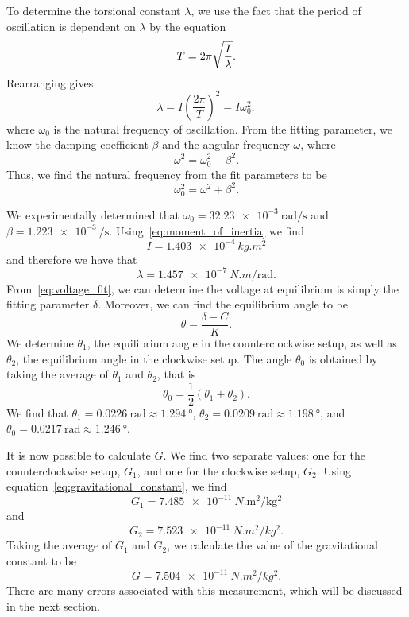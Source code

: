\documentclass[aps, reprint,amsmath,amssymb]{revtex4-1} %
\begin{document}
To determine the torsional constant $\lambda$, we use the fact that the
period of oscillation is dependent on $\lambda$ by the equation
\[
    T = 2\pi \sqrt{I \over \lambda}.
\]
Rearranging gives
\[
    \lambda = I \left(\frac{2\pi}{T}\right)^2 = I \omega_0^2,
\]
where $\omega_0$ is the natural frequency of oscillation. From the fitting
parameter, we know the damping coefficient $\beta$ and the angular
frequency $\omega$, where
\[
    \omega^2 = \omega_0^2 - \beta^2.
\]
Thus, we find the natural frequency from the fit parameters to be
\[
    \omega_0^2 = \omega^2 + \beta^2.    
\]

We experimentally determined that $\omega_0 =
\SI{32.23e-3}{\radian\per\second}$ and $\beta = \SI{1.223e-3}{\per
\second}$. Using~\eqref{eq:moment_of_inertia} we find
\[
    I = \SI{1.403e-4}{kg.m^2}
\]
and therefore we have that
\[
    \lambda = \SI{1.457e-7}{N.m/\radian}.
\]
From~\eqref{eq:voltage_fit}, we can determine the voltage at equilibrium is
simply the fitting parameter $\delta$. Moreover, we can find the equilibrium
angle to be
\[
    \theta = \frac{\delta - C}{K}.
\]
We determine $\theta_1$, the equilibrium angle in the counterclockwise
setup, as well as $\theta_2$, the equilibrium angle in the clockwise setup.
The angle $\theta_0$ is obtained by taking the average of $\theta_1$ and
$\theta_2$, that is
\[
    \theta_0 = \frac{1}{2}(\theta_1 + \theta_2).
\]
We find that $\theta_1 = \SI{0.0226}{\radian} \approx
\SI{1.294}{\degree}$, $\theta_2 = \SI{0.0209}{\radian} \approx
\SI{1.198}{\degree}$, and $\theta_0 = \SI{0.0217}{\radian} \approx
\SI{1.246}{\degree}$.

It is now possible to calculate $G$. We find two separate values: one for
the counterclockwise setup, $G_1$, and one for the clockwise setup, $G_2$.
Using equation~\eqref{eq:gravitational_constant}, we find
\[
    G_1 = \SI{7.485e-11}{N.\meter^2 \per \kilogram^2}
\]
and
\[
    G_2 = \SI{7.523e-11}{N.m^2/kg^2}.
\]  
Taking the average of $G_1$ and $G_2$, we calculate the value of the
gravitational constant to be
\[
    G = \SI{7.504e-11}{N.m^2/kg^2}.
\]
There are many errors associated with this measurement, which will be
discussed in the next section.
\end{document}
